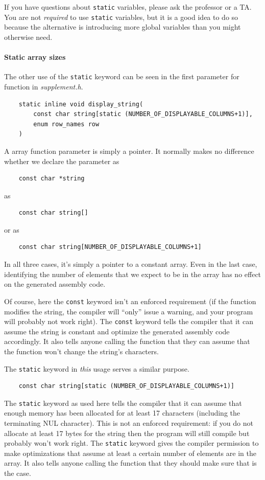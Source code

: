 If you have questions about \lstinline{static} variables, please ask the professor or a TA.
You are not \textit{required} to use \lstinline{static} variables, but it is a good idea to do so because the alternative is introducing more global variables than you might otherwise need.

\paragraph{Static array sizes}

The other use of the \lstinline{static} keyword can be seen in the first parameter for  function in \textit{supplement.h}.
\begin{lstlisting}
    static inline void display_string(
        const char string[static (NUMBER_OF_DISPLAYABLE_COLUMNS+1)],
        enum row_names row
    )
\end{lstlisting}
A array function parameter is simply a pointer.
It normally makes no difference whether we declare the parameter as
\begin{lstlisting}
    const char *string
\end{lstlisting}
as
\begin{lstlisting}
    const char string[]
\end{lstlisting}
or as
\begin{lstlisting}
    const char string[NUMBER_OF_DISPLAYABLE_COLUMNS+1]
\end{lstlisting}
In all three cases, it's simply a pointer to a constant array.
Even in the last case, identifying the number of elements that we expect to be in the array has no effect on the generated assembly code.

Of course, here the \lstinline{const} keyword isn't an enforced requirement (if the function modifies the string, the compiler will ``only'' issue a warning, and your program will probably not work right).
The \lstinline{const} keyword tells the compiler that it can assume the string is constant and optimize the generated assembly code accordingly.
It also tells anyone calling the function that they can assume that the function won't change the string's characters.

The \lstinline{static} keyword in \textit{this} usage serves a similar purpose.
\begin{lstlisting}
    const char string[static (NUMBER_OF_DISPLAYABLE_COLUMNS+1)]
\end{lstlisting}
The \lstinline{static} keyword as used here tells the compiler that it can assume that enough memory has been allocated for at least 17 characters (including the terminating NUL character).
This is not an enforced requirement: if you do not allocate at least 17 bytes for the string then the program will still compile but probably won't work right.
The \lstinline{static} keyword gives the compiler permission to make optimizations that assume at least a certain number of elements are in the array.
It also tells anyone calling the function that they should make sure that is the case.

